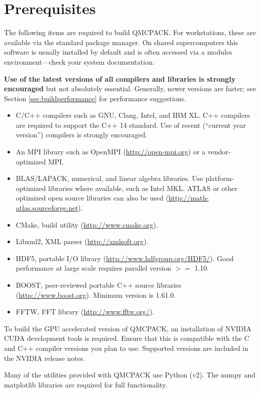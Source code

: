 \section{Prerequisites}
\label{sec:prerequisites}
The following items are required to build QMCPACK. For workstations, these are available via the standard
package manager. On shared supercomputers this software is usually
installed by default and is often
accessed via a modules environment---check your system
documentation.

\textbf{Use of the latest versions of all compilers and libraries is
strongly encouraged} but not absolutely essential. Generally, newer versions are faster; see
Section \ref{sec:buildperformance} for performance suggestions.

\begin{itemize}
\item C/C++ compilers such as GNU, Clang, Intel, and IBM XL. C++ compilers
  are required to support the C++ 14 standard. Use of recent (``current
  year version'') compilers is strongly encouraged.
\item An MPI library such as OpenMPI (\url{http://open-mpi.org}) or a vendor-optimized MPI.
\item BLAS/LAPACK, numerical, and linear algebra libraries. Use
  platform-optimized libraries where available, such as Intel MKL.
  ATLAS or other optimized open source libraries can also be used
  (\url{http://math-atlas.sourceforge.net}).
\item CMake, build utility (\url{http://www.cmake.org}).
\item Libxml2, XML parser (\url{http://xmlsoft.org}).
\item HDF5, portable I/O library (\url{http://www.hdfgroup.org/HDF5/}). Good performance at large scale requires parallel version $>=$ 1.10.
\item BOOST, peer-reviewed portable C++ source libraries  (\url{http://www.boost.org}).   Minimum version is 1.61.0.
\item FFTW, FFT library (\url{http://www.fftw.org/}).
\end{itemize}

To build the GPU accelerated version of QMCPACK, an installation of
NVIDIA CUDA development tools is required. Ensure that this is
compatible with the C and C++ compiler versions you plan to
use. Supported versions are included in the NVIDIA release notes.

Many of the utilities provided with QMCPACK use Python (v2). The numpy
and matplotlib libraries are required for full functionality.

